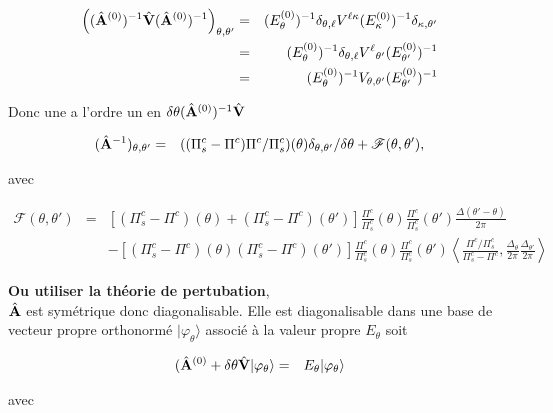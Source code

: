 \begin{eqnarray*}
	\left ( (\hat{\mathbf{A}}^{(0)})^{-1} \hat{\mathbf{V}}	(\hat{\mathbf{A}}^{(0)})^{-1} \right)	_{\theta,\theta'} & = & (E_\theta^{(0)})^{-1} \delta_{\theta, \ell}  V^{\ell \kappa} (E_\kappa^{(0)})^{-1} \delta_{\kappa, \theta'} \\
	& = & (E_\theta^{(0)})^{-1} \delta_{\theta, \ell} {V^{\ell }}_{\theta'} (E_{\theta'}^{(0)})^{-1}\\
	& = & (E_\theta^{(0)})^{-1}  V_{\theta , \theta'} (E_{\theta'}^{(0)})^{-1}
\end{eqnarray*}

\begin{aff}
Donc une a l'ordre un en $\delta \theta (\hat{\mathbf{A}}^{(0)})^{-1} \hat{\mathbf{V}}$ 

\begin{eqnarray*}
	(\hat{\mathbf{A}}^{-1})_{\theta,\theta'} & = &  ( (\Pi^c_s - \Pi^c)\Pi^c/\Pi^c_s ) ( \theta ) \delta_{\theta, \theta'}/\delta \theta + \mathscr{F}(\theta , \theta' ) ,	
\end{eqnarray*}

avec 

\begin{eqnarray*}
	\mathscr{F}(\theta , \theta' ) & = & \left [ (\Pi^c_s - \Pi^c )( \theta)  +  (\Pi^c_s - \Pi^c ) ( \theta' )\right ] \frac{\Pi^c}{\Pi^c_s}(\theta)\frac{\Pi^c}{\Pi^c_s}(\theta') \frac{ \Delta( \theta'- \theta )}{ 2 \pi }\\
	&&  - \left [ (\Pi^c_s - \Pi^c )( \theta)   (\Pi^c_s - \Pi^c ) ( \theta' )\right ] \frac{\Pi^c}{\Pi^c_s}(\theta)\frac{\Pi^c}{\Pi^c_s}(\theta')\left \langle  \frac{ \Pi^c/\Pi^c_s}{\Pi^c_s - \Pi^c} , \frac{\Delta_\theta}{2 \pi}\frac{\Delta_{\theta'}}{2 \pi} \right \rangle 	
\end{eqnarray*}
\end{aff}


{\bf Ou utiliser la théorie de pertubation},\\


$\hat{\mathbf{A}}$  est symétrique donc diagonalisable. Elle est diagonalisable dans une base de vecteur propre orthonormé $\vert \varphi_\theta \rangle $ associé à la valeur propre $E_\theta$ soit 

\begin{eqnarray*}
	(\hat{\mathbf{A}}^{(0)} + \delta \theta \hat{\mathbf{V}} \vert \varphi_\theta \rangle & = & 	E_\theta \vert \varphi_\theta \rangle	
\end{eqnarray*}

avec 

